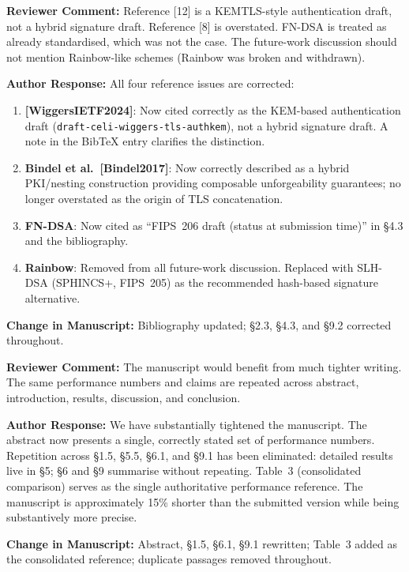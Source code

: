 \documentclass[12pt]{article}
\newcommand{\RC}[1]{\textcolor{reviewerblue}{\textbf{Reviewer Comment:}} #1}
\newcommand{\AR}[1]{\textcolor{replygreen}{\textbf{Author Response:}} #1}
\newcommand{\CH}[1]{\textcolor{changemagenta}{\textbf{Change in Manuscript:}} #1}
\begin{document}
\begin{reviewbox}
\RC{Reference [12] is a KEMTLS-style authentication draft, not a hybrid
signature draft.  Reference [8] is overstated.  FN-DSA is treated as
already standardised, which was not the case.  The future-work discussion
should not mention Rainbow-like schemes (Rainbow was broken and withdrawn).}
\end{reviewbox}

\begin{replybox}
\AR{All four reference issues are corrected:

\begin{enumerate}
  \item \textbf{[WiggersIETF2024]}: Now cited correctly as the
        KEM-based authentication draft (\texttt{draft-celi-wiggers-tls-authkem}),
        not a hybrid signature draft.  A note in the BibTeX entry clarifies
        the distinction.
  \item \textbf{Bindel et al.\ [Bindel2017]}: Now correctly described as a
        hybrid PKI/nesting construction providing composable unforgeability
        guarantees; no longer overstated as the origin of TLS concatenation.
  \item \textbf{FN-DSA}: Now cited as ``FIPS~206 draft (status at submission
        time)'' in \S4.3 and the bibliography.
  \item \textbf{Rainbow}: Removed from all future-work discussion.
        Replaced with SLH-DSA (SPHINCS+, FIPS~205) as the recommended
        hash-based signature alternative.
\end{enumerate}}

\CH{Bibliography updated; \S2.3, \S4.3, and \S9.2 corrected throughout.}
\end{replybox}

\begin{reviewbox}
\RC{The manuscript would benefit from much tighter writing.  The same
performance numbers and claims are repeated across abstract, introduction,
results, discussion, and conclusion.}
\end{reviewbox}

\begin{replybox}
\AR{We have substantially tightened the manuscript.  The abstract now
presents a single, correctly stated set of performance numbers.  Repetition
across \S1.5, \S5.5, \S6.1, and \S9.1 has been eliminated: detailed
results live in \S5; \S6 and \S9 summarise without repeating.
Table~3 (consolidated comparison) serves as the single authoritative
performance reference.  The manuscript is approximately 15\% shorter
than the submitted version while being substantively more precise.}

\CH{Abstract, \S1.5, \S6.1, \S9.1 rewritten; Table~3 added as the
consolidated reference; duplicate passages removed throughout.}
\end{replybox}
\end{document}
